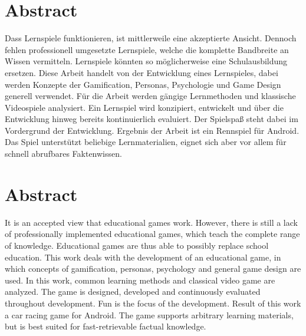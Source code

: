 \section*{Abstract}
Dass Lernspiele funktionieren, ist mittlerweile eine akzeptierte Ansicht. Dennoch fehlen professionell umgesetzte Lernspiele, welche die komplette Bandbreite an Wissen vermitteln. Lernspiele könnten so möglicherweise eine Schulausbildung ersetzen.
Diese Arbeit handelt von der Entwicklung eines Lernspieles, dabei werden Konzepte der Gamification, Personas, Psychologie und Game Design generell verwendet. Für die Arbeit werden gängige Lernmethoden und klassische Videospiele analysiert. Ein Lernspiel wird konzipiert, entwickelt und über die Entwicklung hinweg bereits kontinuierlich evaluiert. Der Spielspaß steht dabei im Vordergrund der Entwicklung.
Ergebnis der Arbeit ist ein Rennspiel für Android. Das Spiel unterstützt beliebige Lernmaterialien, eignet sich aber vor allem für schnell abrufbares Faktenwissen.

\vfill

\section*{Abstract}
It is an accepted view that educational games work. However, there is still a lack of professionally implemented educational games, which teach the complete range of knowledge. Educational games are thus able to possibly replace school education.
This work deals with the development of an educational game, in which concepts of gamification, personas, psychology and general game design are used. In this work, common learning methods and classical video game are analyzed. The game is designed, developed and continuously evaluated throughout development. Fun is the focus of the development.
Result of this work a car racing game for Android. The game supports arbitrary learning materials, but is best suited for fast-retrievable factual knowledge.

\vfill\vfill\newpage
